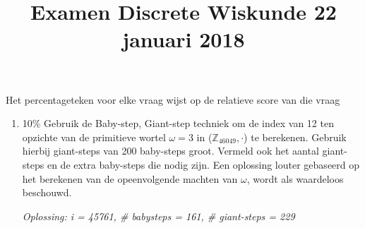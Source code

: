 \documentclass{article}
\def\note#1{\color{cyan} #1 \color{black}}
\def\solution#1{\color{cyan}\textit{Oplossing: #1}\color{black}}
\begin{document}
\title{Examen Discrete Wiskunde 22 januari 2018}
\date{}
\author{}
\maketitle

\note{Het percentageteken voor elke vraag wijst op de relatieve score van die vraag}

\begin{enumerate}
\item {\note{10\%} Gebruik de Baby-step, Giant-step techniek om de index van 12 ten opzichte van de primitieve wortel $\omega = 3$ in ($\mathbb{Z}_{46049}, \cdot$) te berekenen. Gebruik hierbij giant-steps van 200 baby-steps groot. Vermeld ook het aantal giant-steps en de extra baby-steps die nodig zijn. Een oplossing louter gebaseerd op het berekenen van de opeenvolgende machten van $\omega$, wordt als waardeloos beschouwd. 

\solution{i = 45761, \# babysteps = 161, \# giant-steps = 229}
}


\end{enumerate}
\end{document}
